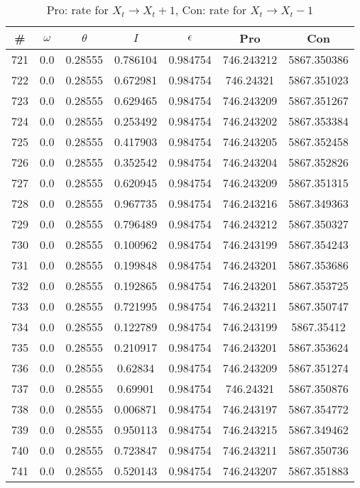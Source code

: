 \newpage
\begin{table}
\caption{Pro: rate for $X_t \rightarrow X_t + 1$, Con: rate for $X_t \rightarrow X_t - 1$}
\begin{tabular*}{\linewidth}{c|c|c|c|c|c|c}
\# & $\omega$ & $\theta$ & $I$ & $\epsilon$ & Pro & Con \\
\hline
721 & 0.0 & 0.28555 & 0.786104 & 0.984754 & 746.243212 & 5867.350386\\
722 & 0.0 & 0.28555 & 0.672981 & 0.984754 & 746.24321 & 5867.351023\\
723 & 0.0 & 0.28555 & 0.629465 & 0.984754 & 746.243209 & 5867.351267\\
724 & 0.0 & 0.28555 & 0.253492 & 0.984754 & 746.243202 & 5867.353384\\
725 & 0.0 & 0.28555 & 0.417903 & 0.984754 & 746.243205 & 5867.352458\\
726 & 0.0 & 0.28555 & 0.352542 & 0.984754 & 746.243204 & 5867.352826\\
727 & 0.0 & 0.28555 & 0.620945 & 0.984754 & 746.243209 & 5867.351315\\
728 & 0.0 & 0.28555 & 0.967735 & 0.984754 & 746.243216 & 5867.349363\\
729 & 0.0 & 0.28555 & 0.796489 & 0.984754 & 746.243212 & 5867.350327\\
730 & 0.0 & 0.28555 & 0.100962 & 0.984754 & 746.243199 & 5867.354243\\
731 & 0.0 & 0.28555 & 0.199848 & 0.984754 & 746.243201 & 5867.353686\\
732 & 0.0 & 0.28555 & 0.192865 & 0.984754 & 746.243201 & 5867.353725\\
733 & 0.0 & 0.28555 & 0.721995 & 0.984754 & 746.243211 & 5867.350747\\
734 & 0.0 & 0.28555 & 0.122789 & 0.984754 & 746.243199 & 5867.35412\\
735 & 0.0 & 0.28555 & 0.210917 & 0.984754 & 746.243201 & 5867.353624\\
736 & 0.0 & 0.28555 & 0.62834 & 0.984754 & 746.243209 & 5867.351274\\
737 & 0.0 & 0.28555 & 0.69901 & 0.984754 & 746.24321 & 5867.350876\\
738 & 0.0 & 0.28555 & 0.006871 & 0.984754 & 746.243197 & 5867.354772\\
739 & 0.0 & 0.28555 & 0.950113 & 0.984754 & 746.243215 & 5867.349462\\
740 & 0.0 & 0.28555 & 0.723847 & 0.984754 & 746.243211 & 5867.350736\\
741 & 0.0 & 0.28555 & 0.520143 & 0.984754 & 746.243207 & 5867.351883\\

\end{tabular*}
\end{table}
